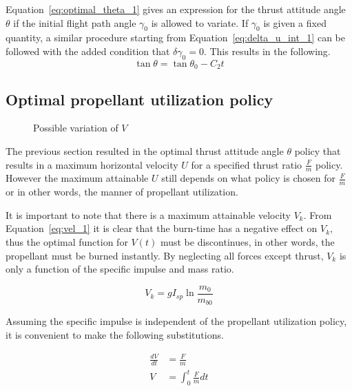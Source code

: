 Equation~\eqref{eq:optimal_theta_1} gives an expression for the thrust attitude angle $\theta$ if the initial flight path angle $\gamma_0$ is allowed to variate. If $\gamma_0$ is given a fixed quantity, a similar procedure starting from Equation~\eqref{eq:delta_u_int_1} can be followed with the added condition that $\delta \gamma_0=0$. This results in the following.
\begin{equation}
    \label{eq:optimal_theta_2}
    \tan\theta=\tan\theta_0-C_2t
\end{equation}


\subsection{Optimal propellant utilization policy}
\begin{figure}        
    \begin{center}        
        		
    \end{center}    
    \caption{Possible variation of $V$}
    \label{fig:possible_var_v}    
\end{figure}

The previous section resulted in the optimal thrust attitude angle $\theta$ policy that results in a maximum horizontal velocity $U$ for a specified thrust ratio $\frac{F}{m}$ policy. However the maximum attainable $U$ still depends on what policy is chosen for $\frac{F}{m}$ or in other words, the manner of propellant utilization.

It is important to note that there is a maximum attainable velocity $V_k$. From Equation~\eqref{eq:vel_1} it is clear that the burn-time has a negative effect on $V_k$, thus the optimal function for $V(t)$ must be discontinues, in other words, the propellant must be burned instantly. By neglecting all forces except thrust, $V_k$ is only a function of the specific impulse and mass ratio.

\begin{equation}
    V_k=gI_{sp} \ln{\frac{m_0}{m_{b0}}}
\end{equation}

Assuming the specific impulse is independent of the propellant utilization policy, it is convenient to make the following substitutions.

\begin{align}
    \frac{dV}{dt} &= \frac{F}{m} \\
    V &= \int_0^t{\frac{F}{m}} dt
\end{align}



